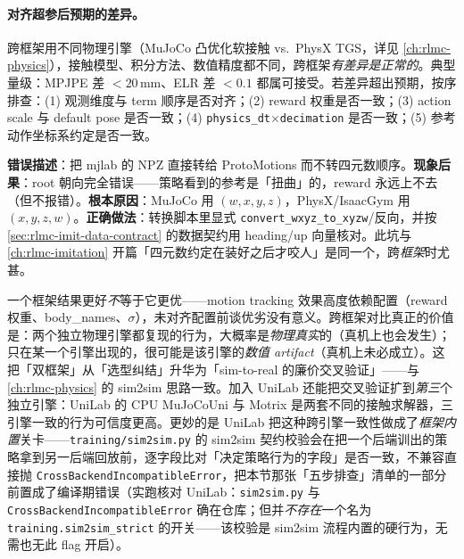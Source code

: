 \paragraph{对齐超参后预期的差异。}跨框架用不同物理引擎（MuJoCo 凸优化软接触 vs.\ PhysX TGS，详见 \cref{ch:rlmc-physics}），接触模型、积分方法、数值精度都不同，跨框架\emph{有差异是正常的}。典型量级：MPJPE 差 $<20$\,mm、ELR 差 $<0.1$ 都属可接受。若差异超出预期，按序排查：(1) 观测维度与 term 顺序是否对齐；(2) reward 权重是否一致；(3) action scale 与 default pose 是否一致；(4) \verb|physics_dt|$\times$\verb|decimation| 是否一致；(5) 参考动作坐标系约定是否一致。

\begin{pitfall}
\textbf{错误描述}：把 mjlab 的 NPZ 直接转给 ProtoMotions 而不转四元数顺序。\textbf{现象后果}：root 朝向完全错误——策略看到的参考是「扭曲」的，reward 永远上不去（但不报错）。\textbf{根本原因}：MuJoCo 用 $(w,x,y,z)$，PhysX/IsaacGym 用 $(x,y,z,w)$。\textbf{正确做法}：转换脚本里显式 \verb|convert_wxyz_to_xyzw|/反向，并按 \cref{sec:rlmc-imit-data-contract} 的数据契约用 heading/up 向量核对。此坑与 \cref{ch:rlmc-imitation} 开篇「四元数约定在装好之后才咬人」是同一个，跨\emph{框架}时尤甚。
\end{pitfall}

\begin{insight}\label{ins:rlmc-mi-cross}
一个框架结果更好\emph{不}等于它更优——motion tracking 效果高度依赖配置（reward 权重、body\_names、$\sigma$），未对齐配置前谈优劣没有意义。跨框架对比真正的价值是：两个独立物理引擎都复现的行为，大概率是\emph{物理真实}的（真机上也会发生）；只在某一个引擎出现的，很可能是该引擎的\emph{数值 artifact}（真机上未必成立）。这把「双框架」从「选型纠结」升华为「sim-to-real 的廉价交叉验证」——与 \cref{ch:rlmc-physics} 的 sim2sim 思路一致。加入 UniLab 还能把交叉验证扩到\emph{第三}个独立引擎：UniLab 的 CPU MuJoCoUni 与 Motrix 是两套不同的接触求解器，三引擎一致的行为可信度更高。更妙的是 UniLab 把这种跨引擎一致性做成了\emph{框架内置}关卡——\verb|training/sim2sim.py| 的 sim2sim 契约校验会在把一个后端训出的策略拿到另一后端回放前，逐字段比对「决定策略行为的字段」是否一致，不兼容直接抛 \verb|CrossBackendIncompatibleError|，把本节那张「五步排查」清单的一部分前置成了编译期错误（实跑核对 UniLab：\verb|sim2sim.py| 与 \verb|CrossBackendIncompatibleError| 确在仓库；但并\emph{不存在}一个名为 \verb|training.sim2sim_strict| 的开关——该校验是 sim2sim 流程内置的硬行为，无需也无此 flag 开启）。
\end{insight}

